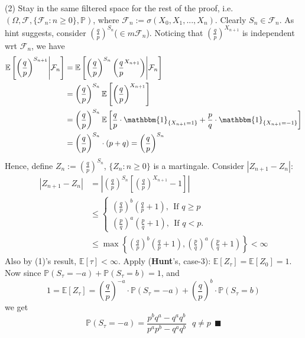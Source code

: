 \documentclass[a4paper,12pt,twoside]{book}
\begin{document}
\begin{itemize}
\begin{itemize}
	(2) Stay in the same filtered space for the rest of the proof, i.e. $(\Omega, \mathcal{F}, \{\mathcal{F}_n:n\geq 0 \}, \mathbb{P})$, where $\mathcal{F}_n:=\sigma(X_0, X_1, ..., X_n)$. Clearly $S_n \in \mathcal{F}_n$. As hint suggests, consider $(\frac{q}{p})^{S_n}$($\in m \mathcal{F}_n$). Noticing that $(\frac{q}{p})^{X_{n+1}}$ is independent wrt $\mathcal{F}_n$, we have
	\begin{equation}
		\begin{split}
			\mathbb{E}\left[\left(\frac{q}{p}\right)^{S_{n+1}}\middle|\mathcal{F}_n\right]&=\mathbb{E}\left[\left(\frac{q}{p}\right)^{S_{n}}\left(\frac{q}{p}^{X_{n+1}}\right)\middle|\mathcal{F}_n\right]\\
			&=\left(\frac{q}{p}\right)^{S_n} \mathbb{E}\left[\left(\frac{q}{p}\right)^{X_{n+1}}\right]\\
			&=\left(\frac{q}{p}\right)^{S_n} \mathbb{E}\left[\frac{q}{p}\cdot \mathbbm{1}_{\{X_{n+1}=1\}}+\frac{p}{q}\cdot \mathbbm{1}_{\{X_{n+1}=-1\}}\right]\\
			&=\left(\frac{q}{p}\right)^{S_n}\cdot \left(p+q\right)=\left(\frac{q}{p}\right)^{S_n}
		\end{split}
	\end{equation}
	Hence, define $Z_n:=\left(\frac{q}{p}\right)^{S_n}$, $\{Z_n: n\geq 0\}$ is a martingale. Consider $|Z_{n+1}-Z_n|$:
	\begin{equation}
		\begin{split}
			|Z_{n+1}-Z_n|&=\left|\left(\frac{q}{p}\right)^{S_n}\left[\left(\frac{q}{p} \right)^{X_{n+1}}-1\right]\right|\\
			&\leq\begin{cases}
				\left(\frac{q}{p}\right)^b \left(\frac{q}{p}+1\right),~~\text{If $q\geq p$}\\
				\left(\frac{p}{q}\right)^a \left(\frac{p}{q}+1\right),~~\text{If $q<p$.}
			\end{cases}\\
			&\leq \max\left\{\left(\frac{q}{p}\right)^b \left(\frac{q}{p}+1\right), \left(\frac{p}{q}\right)^a \left(\frac{p}{q}+1\right)\right\}<\infty
		\end{split}
	\end{equation}
	Also by (1)'s result, $\mathbb{E}\left[\tau\right]<\infty$. Apply (\textbf{Hunt}'s, case-3): $\mathbb{E}\left[Z_{\tau}\right]=\mathbb{E}\left[Z_0\right]=1$. \newline
	Now since $\mathbb{P}\left(S_{\tau}=-a\right)+\mathbb{P}\left(S_{\tau}=b\right)=1$, and 
	\begin{equation}
		1=\mathbb{E}\left[Z_{\tau}\right]=\left(\frac{q}{p}\right)^{-a} \cdot \mathbb{P}\left(S_{\tau}=-a\right)+\left(\frac{q}{p}\right)^{b} \cdot \mathbb{P}\left(S_{\tau}=b\right)
	\end{equation}
	we get
	\begin{equation}
		\mathbb{P}\left(S_{\tau}=-a\right) = \frac{p^b q^a - q^a q^b}{p^ap^b - q^a q^b}~~~q\ne p~~\blacksquare
	\end{equation}


\end{itemize}
\end{itemize}
\end{document}
